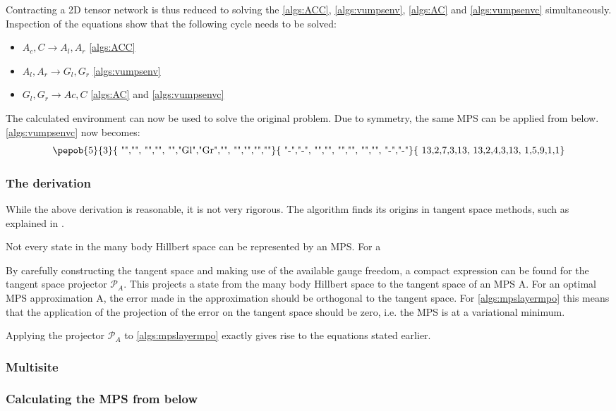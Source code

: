 
Contracting a 2D tensor network is thus reduced to solving the  \cref{algs:ACC}, \cref{algs:vumpsenv}, \cref{algs:AC} and \cref{algs:vumpsenvc} simultaneously. Inspection of the equations show that the following cycle needs to be solved:

\begin{itemize}
    \item  $A_c,C  \rightarrow A_l,A_r  $  \cref{algs:ACC}
    \item  $A_l,A_r  \rightarrow G_l,G_r  $ \cref{algs:vumpsenv}
    \item  $ G_l,G_r   \rightarrow Ac,C $ \cref{algs:AC} and  \cref{algs:vumpsenvc}
\end{itemize}

The calculated environment can now be used to solve the original problem. Due to symmetry, the same MPS can be applied from below. \cref{algs:vumpsenvc} now becomes:
\begin{equation}
    \vcenter{ \hbox{   \pepob{5}{3}{{
                        "","", "","",
                        "","Gl","Gr","",
                        "","","",""}}{{
                        "-","-",
                        "","",
                        "","",
                        "","",
                        "-","-"}}{{
                        13,2,7,3,13,
                        13,2,4,3,13,
                        1,5,9,1,1}} }}
\end{equation}

\subsubsection{The derivation}\label{vumps_Deriv}
While the above derivation is reasonable, it is not very rigorous. The algorithm finds its origins  in tangent space methods, such as explained in \cite{Vanderstraeten2019}.

Not every state in the many body Hillbert space can be represented by an MPS. For a

By carefully constructing the tangent space and making use of the available gauge freedom, a compact expression can be found for the tangent space projector $\mathcal{P}_A$. This projects a state from the many body Hillbert space to the tangent space of an MPS A. For an optimal MPS approximation A, the error made in the approximation should be orthogonal to the tangent space. For \cref{algs:mpslayermpo} this means that the application of the projection of the error on the tangent space should be zero, i.e. the MPS is at a variational minimum.  \cite{Nietner2020}

Applying the projector $\mathcal{P}_A$ to \cref{algs:mpslayermpo} exactly gives rise to the equations stated earlier.

\subsubsection{Multisite}

\subsubsection{Calculating the MPS from below}

